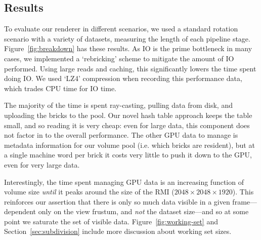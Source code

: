 \subsection{Results}
\label{sec:results}

To evaluate our renderer in different scenarios, we used a standard
rotation scenario with a variety of datasets, measuring the length of
each pipeline stage.  Figure~\ref{fig:breakdown} has these results.  As
IO is the prime bottleneck in many cases, we implemented a `rebricking'
scheme to mitigate the amount of IO performed.  Using large reads and
caching, this significantly lowers the time spent doing IO.  We used
`LZ4' compression when recording this performance data, which trades
CPU time for IO time.

The majority of the time is spent ray-casting, pulling data from disk,
and uploading the bricks to the pool.  Our novel hash table approach
keeps the table small, and so reading it is very cheap: even for large
data, this component does not factor in to the overall performance.
The other GPU data to manage is metadata information for our volume
pool (i.e. which bricks are resident), but at a single machine word per
brick it costs very little to push it down to the GPU, even for very
large data.

Interestingly, the time spent managing GPU data is an increasing
function of volume size \emph{until} it peaks around the size of the
RMI ($2048\times2048\times1920$).  This reinforces our assertion that
there is only so much data visible in a given frame---dependent only on
the view
frustum, and \emph{not} the dataset size---and so at some point we
saturate the set of visible data.  Figure~\ref{fig:working-set} and
Section~\ref{sec:subdivision} include more discussion about working set
sizes.


